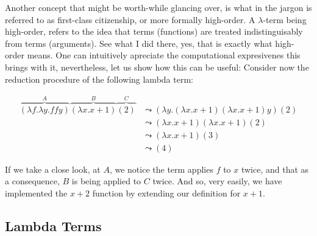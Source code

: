 \documentclass[12pt]{book}
\newcommand{\curly}{\mathrel{\leadsto}}
\theoremstyle{plain}
\theoremstyle{definition}
\theoremstyle{definition}
\theoremstyle{remark}
\begin{document}
Another concept that might be worth-while glancing over, is what in the jargon is referred to as first-class citizenship, or more formally high-order. A $\lambda$-term being high-order, refers to the idea that terms (functions) are treated indistinguisably from terms (arguments). See what I did there, yes, that is exactly what high-order means. One can intuitively apreciate the computational expresivenes this brings with it, nevertheless, let us show how this can be useful: Consider now the reduction procedure of the following lambda term:

\begin{align*}
  \overbrace { (\lambda f . \lambda y . f f y) }^{A} \overbrace{ (\lambda x . x + 1) }^{B} \overbrace{(2)}^{C}
  &\curly (\lambda y .(\lambda x . x + 1) (\lambda x . x + 1)y)(2) \\
  &\curly (\lambda x . x + 1)(\lambda x . x + 1)(2) \\
  &\curly (\lambda x . x + 1) (3) \\
  &\curly (4)
\end{align*}

If we take a close look, at $A$, we notice the term applies $f$ to $x$ twice, and that as a consequence, $B$ is being applied to $C$ twice. And so, very easily, we have implemented the $ x + 2 $ function by extending our definition for $x + 1$.

\subsection*{\centering
  Lambda Terms}
\end{document}
